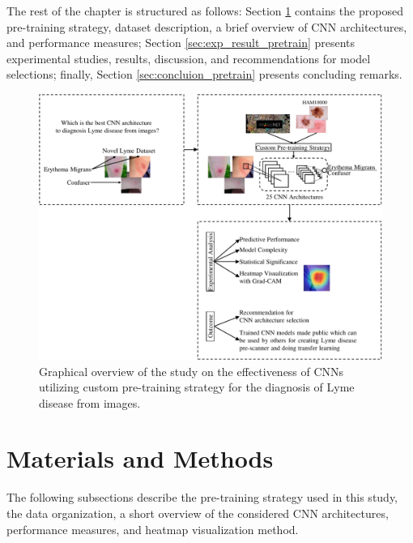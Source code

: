 The rest of the chapter is structured as follows: Section \ref{sec:matandmeth} contains the proposed pre-training strategy, dataset description, a brief overview of CNN architectures, and performance measures; Section \ref{sec:exp_result_pretrain} presents experimental studies, results, discussion, and recommendations for model selections; finally, Section \ref{sec:concluion_pretrain} presents concluding remarks.
\begin{figure}[htb!]
	\centering
	\includegraphics[width=\textwidth,keepaspectratio]{images/pretraining/Visualization-cropped.pdf}
	\caption{Graphical overview of the study on the effectiveness of CNNs utilizing custom pre-training strategy for the diagnosis of Lyme disease from images.}
	\label{fig:visualization-benchmark}
\end{figure}
\section{Materials and Methods}\label{sec:matandmeth}
The following subsections describe the pre-training strategy used in this study, the data organization, a short overview of the considered CNN architectures, performance measures, and heatmap visualization method.
